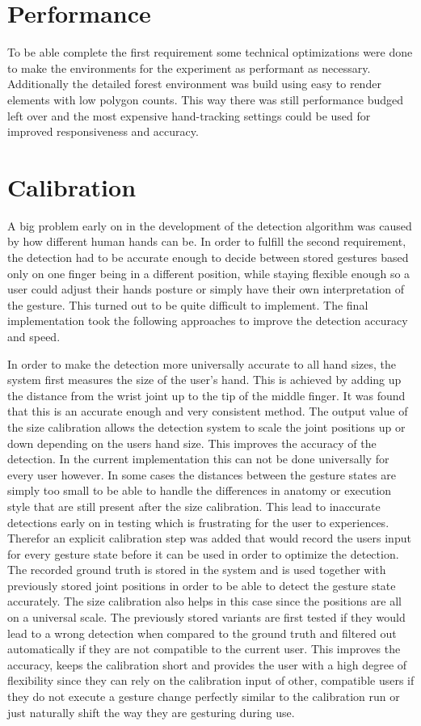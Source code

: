 \section{Performance}
To be able complete the first requirement some technical optimizations were done to make the environments for the experiment as performant as necessary. Additionally the detailed forest environment was build using easy to render elements with low polygon counts. This way there was still performance budged left over and the most expensive hand-tracking settings could be used for improved responsiveness and accuracy.

\section{Calibration}
A big problem early on in the development of the detection algorithm was caused by how different human hands can be. In order to fulfill the second requirement, the detection had to be accurate enough to decide between stored gestures based only on one finger being in a different position, while staying flexible enough so a user could adjust their hands posture or simply have their own interpretation of the gesture. This turned out to be quite difficult to implement. The final implementation took the following approaches to improve the detection accuracy and speed.

In order to make the detection more universally accurate to all hand sizes, the system first measures the size of the user's hand. This is achieved by adding up the distance from the wrist joint up to the tip of the middle finger. It was found that this is an accurate enough and very consistent method. The output value of the size calibration allows the detection system to scale the joint positions up or down depending on the users hand size. This improves the accuracy of the detection. In the current implementation this can not be done universally for every user however. In some cases the distances between the gesture states are simply too small to be able to handle the differences in anatomy or execution style that are still present after the size calibration. This lead to inaccurate detections early on in testing which is frustrating for the user to experiences. Therefor an explicit calibration step was added that would record the users input for every gesture state before it can be used in order to optimize the detection. The recorded ground truth is stored in the system and is used together with previously stored joint positions in order to be able to detect the gesture state accurately. The size calibration also helps in this case since the positions are all on a universal scale. The previously stored variants are first tested if they would lead to a wrong detection when compared to the ground truth and filtered out automatically if they are not compatible to the current user. This improves the accuracy, keeps the calibration short and provides the user with a high degree of flexibility since they can rely on the calibration input of other, compatible users if they do not execute a gesture change perfectly similar to the calibration run or just naturally shift the way they are gesturing during use.

